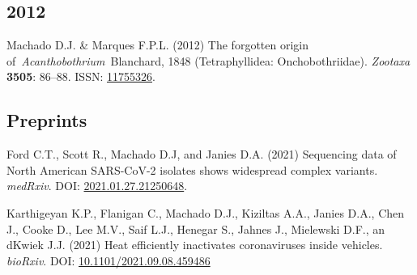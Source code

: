 
\subsection{2012}

    {\setlength{\parskip}{.5em}\renewcommand{\baselinestretch}{2.0}\begin{hangparas}{.25in}{1}
		Machado D.J. \& Marques F.P.L. (2012) The forgotten origin of~\emph{Acanthobothrium}~Blanchard, 1848 (Tetraphyllidea: Onchobothriidae). \emph{Zootaxa} \textbf{3505}: 86--88. ISSN: \href{http://www.mapress.com/zootaxa/2012/f/z03505p088f.pdf}{11755326}.
	\end{hangparas}}

        
%


\subsection{Preprints}

	{
		\setlength{\parskip}{.5em}\renewcommand{\baselinestretch}{2.0}
		\begin{hangparas}{.25in}{1}
		
		Ford C.T., Scott R.,  Machado D.J, and  Janies D.A. (2021) Sequencing data of North American SARS-CoV-2 isolates shows widespread complex variants. \textit{medRxiv}. DOI: \href{https://doi.org/10.1101/2021.01.27.21250648}{2021.01.27.21250648}.
		
		Karthigeyan K.P., Flanigan C., Machado D.J., Kiziltas A.A., Janies D.A., Chen J., Cooke D., Lee M.V., Saif L.J., Henegar S., Jahnes J., Mielewski D.F., an dKwiek J.J. (2021) Heat efficiently inactivates coronaviruses inside vehicles. \textit{bioRxiv}. DOI: \href{https://doi.org/10.1101/2021.09.08.459486}{10.1101/2021.09.08.459486}
		
		\end{hangparas}
	}